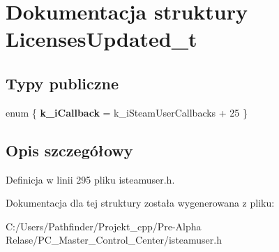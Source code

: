 \hypertarget{struct_licenses_updated__t}{}\section{Dokumentacja struktury Licenses\+Updated\+\_\+t}
\label{struct_licenses_updated__t}
\subsection*{Typy publiczne}
\begin{DoxyCompactItemize}
\item 
\mbox{\label{struct_licenses_updated__t_adb777aa627043de67c1d83736e12d6b3}} 
enum \{ {\bfseries k\+\_\+i\+Callback} = k\+\_\+i\+Steam\+User\+Callbacks + 25
 \}
\end{DoxyCompactItemize}


\subsection{Opis szczegółowy}


Definicja w linii 295 pliku isteamuser.\+h.



Dokumentacja dla tej struktury została wygenerowana z pliku\+:\begin{DoxyCompactItemize}
\item 
C\+:/\+Users/\+Pathfinder/\+Projekt\+\_\+cpp/\+Pre-\/\+Alpha Relase/\+P\+C\+\_\+\+Master\+\_\+\+Control\+\_\+\+Center/isteamuser.\+h\end{DoxyCompactItemize}
